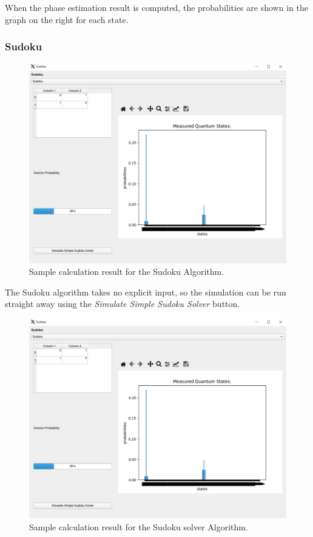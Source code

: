 \documentclass{article}
\begin{document}
When the phase estimation result is computed, the probabilities are shown in the graph on the right for each state.

\subsubsection{Sudoku}

\begin{figure}[H]
\includegraphics[width=15cm]{docs/images/gui_calculation_sudoku.png}
\caption{\label{fig:gui-calculation-sudoku} Sample calculation result for the Sudoku Algorithm.}
\end{figure}

The Sudoku algorithm takes no explicit input, so the simulation can be run straight away using the \textit{Simulate Simple Sudoku Solver} button.

\begin{figure}[H]
\includegraphics[width=15cm]{docs/images/gui_calculation_sudoku.png}
\caption{\label{gui-calculation-sudoku} Sample calculation result for the Sudoku solver Algorithm.}
\end{figure}
\end{document}

